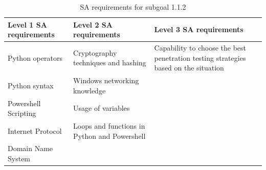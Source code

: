 \begin{table}[H]
    \begin{center}
    \begin{tabular}{ | m{5cm} | m{5cm}| m{5cm} | } 
      \hline
      \textbf{Level 1 SA requirements} & \textbf{Level 2 SA requirements}  & \textbf{Level 3 SA requirements}  \\ 
      \hline
      Python operators & Cryptography techniques and hashing & Capability to choose the best penetration testing strategies based on the situation\\ 
      \hline
      Python syntax & Windows networking knowledge & \\ 
      \hline
      Powershell Scripting & Usage of variables & \\ 
      \hline
      Internet Protocol & Loops and functions in Python and Powershell  & \\ 
      \hline
      Domain Name System &  & \\ 
      \hline
    \end{tabular}
    \end{center}
    \caption{SA requirements for subgoal 1.1.2}
    \end{table}
    